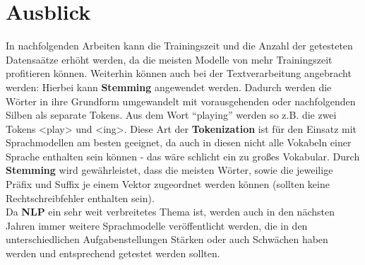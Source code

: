 \section{Ausblick}
In nachfolgenden Arbeiten kann die Trainingszeit und die Anzahl der getesteten Datensa\"atze erh\"oht werden, da die meisten Modelle von mehr Trainingszeit profitieren k\"onnen. Weiterhin k\"onnen auch bei der Textverarbeitung angebracht werden: Hierbei kann \textbf{Stemming} angewendet werden. Dadurch werden die W\"orter in ihre Grundform umgewandelt mit vorausgehenden oder nachfolgenden Silben als separate Tokens. Aus dem Wort "`playing"' werden so z.B. die zwei Tokens <play> und <ing>. Diese Art der \textbf{Tokenization} ist f\"ur den Einsatz mit Sprachmodellen am besten geeignet, da auch in diesen nicht alle Vokabeln einer Sprache enthalten sein k\"onnen - das w\"are schlicht ein zu gro{\ss}es Vokabular. Durch \textbf{Stemming} wird gew\"ahrleistet, dass die meisten W\"orter, sowie die jeweilige Pr\"afix und Suffix je einem Vektor zugeordnet werden k\"onnen (sollten keine Rechtschreibfehler enthalten sein).\\
Da \textbf{NLP} ein sehr weit verbreitetes Thema ist, werden auch in den n\"achsten Jahren immer weitere Sprachmodelle ver\"offentlicht werden, die in den unterschiedlichen Aufgabenstellungen St\"arken oder auch Schw\"achen haben werden und entsprechend getestet werden sollten.
